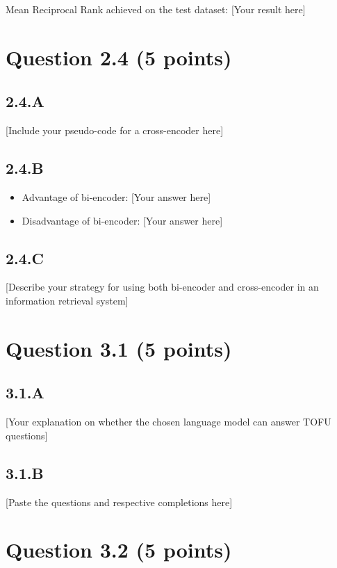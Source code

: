 \documentclass{article}
\begin{document}
Mean Reciprocal Rank achieved on the test dataset: [Your result here]

\section*{Question 2.4 (5 points)}

\subsection*{2.4.A}

[Include your pseudo-code for a cross-encoder here]

\subsection*{2.4.B}

\begin{itemize}
    \item Advantage of bi-encoder: [Your answer here]
    \item Disadvantage of bi-encoder: [Your answer here]
\end{itemize}

\subsection*{2.4.C}

[Describe your strategy for using both bi-encoder and cross-encoder in an information retrieval system]

\section*{Question 3.1 (5 points)}

\subsection*{3.1.A}

[Your explanation on whether the chosen language model can answer TOFU questions]

\subsection*{3.1.B}

[Paste the questions and respective completions here]

\section*{Question 3.2 (5 points)}
\end{document}

